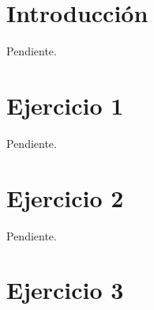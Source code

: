 \documentclass[a4paper,10pt,twoside]{article}
\begin{document}
\newpage




\tableofcontents

\newpage




\section{Introducción}

Pendiente.




\section{Ejercicio 1}

Pendiente.




\section{Ejercicio 2}

Pendiente.




\section{Ejercicio 3}
\end{document}
